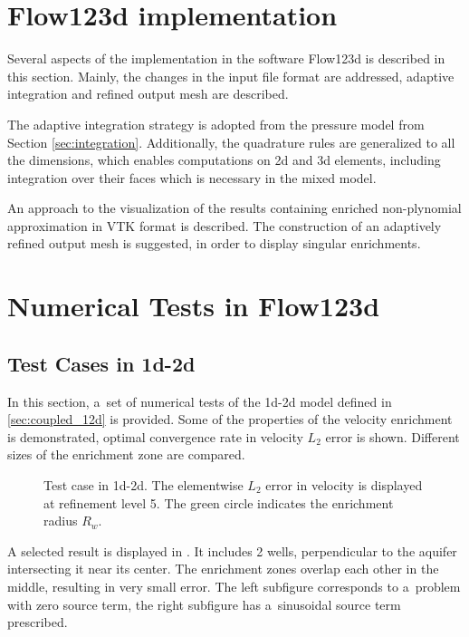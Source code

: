 
\section{Flow123d implementation}
Several aspects of the implementation in the software Flow123d is described in this section.
Mainly, the changes in the input file format are addressed,
adaptive integration and refined output mesh are described.

The adaptive integration strategy is adopted from the pressure model from Section \ref{sec:integration}.
Additionally, the quadrature rules are generalized to all the dimensions, which enables
computations on 2d and 3d elements, including integration over their faces which is necessary in the mixed model.

An approach to the visualization of the results containing enriched non-plynomial approximation  in VTK format is described.
The construction of an adaptively refined output mesh is suggested, in order to display singular enrichments.


\section{Numerical Tests in Flow123d}
\subsection{Test Cases in 1d-2d} \label{sec:num_test_cases_1d2d}
In this section, a~set of numerical tests of the 1d-2d model defined in \ref{sec:coupled_12d} is provided.
Some of the properties of the velocity enrichment is demonstrated, optimal convergence rate in velocity $L_2$ error
is shown. Different sizes of the enrichment zone are compared.

\begin{figure}[!htb]
    \centering
    \caption[Error distribution in 1d-2d.]
    {Test case in 1d-2d. The elementwise $L_2$ error in velocity is displayed at refinement level 5.
    The green circle indicates the enrichment radius $R_w$. }
    \label{fig:mh_tc2_error}
\end{figure}
A selected result is displayed in .
It includes 2 wells, perpendicular to the aquifer intersecting it near its center.
The enrichment zones overlap each other in the middle, resulting in very small error.
The left subfigure corresponds to a~problem with zero source term, the right subfigure
has a~sinusoidal source term prescribed.

